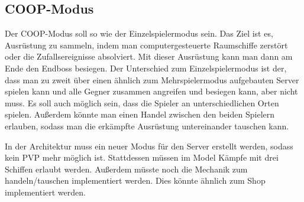 \documentclass[fontsize=12pt,paper=a4,twoside]{scrartcl}
\begin{document}
\subsection{COOP-Modus}
{
Der COOP-Modus soll so wie der Einzelspielermodus sein. Das Ziel ist es, Ausrüstung zu sammeln, indem man computergesteuerte Raumschiffe zerstört oder die Zufallsereignisse absolviert. Mit dieser Ausrüstung kann man dann am Ende den Endboss besiegen. Der Unterschied zum Einzelspielermodus ist der, dass man zu zweit über einen ähnlich zum Mehrspielermodus aufgebauten Server spielen kann und alle Gegner zusammen angreifen und besiegen kann, aber nicht muss. Es soll auch möglich sein, dass die Spieler an unterschiedlichen Orten spielen. Außerdem könnte man einen Handel zwischen den beiden Spielern erlauben, sodass man die erkämpfte Ausrüstung untereinander tauschen kann.

In der Architektur muss ein neuer Modus für den Server erstellt werden, sodass kein PVP mehr möglich ist. Stattdessen müssen im Model Kämpfe mit drei Schiffen erlaubt werden. Außerdem müsste noch die Mechanik zum handeln/tauschen implementiert werden. Dies könnte ähnlich zum Shop implementiert werden.
}
\end{document}
